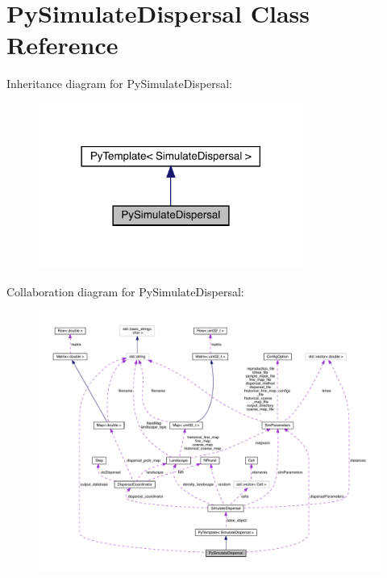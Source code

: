 \hypertarget{class_py_simulate_dispersal}{}\section{Py\+Simulate\+Dispersal Class Reference}
\label{class_py_simulate_dispersal}


Inheritance diagram for Py\+Simulate\+Dispersal\+:\nopagebreak
\begin{figure}[H]
\begin{center}
\leavevmode
\includegraphics[width=246pt]{class_py_simulate_dispersal__inherit__graph}
\end{center}
\end{figure}


Collaboration diagram for Py\+Simulate\+Dispersal\+:\nopagebreak
\begin{figure}[H]
\begin{center}
\leavevmode
\includegraphics[width=350pt]{class_py_simulate_dispersal__coll__graph}
\end{center}
\end{figure}
